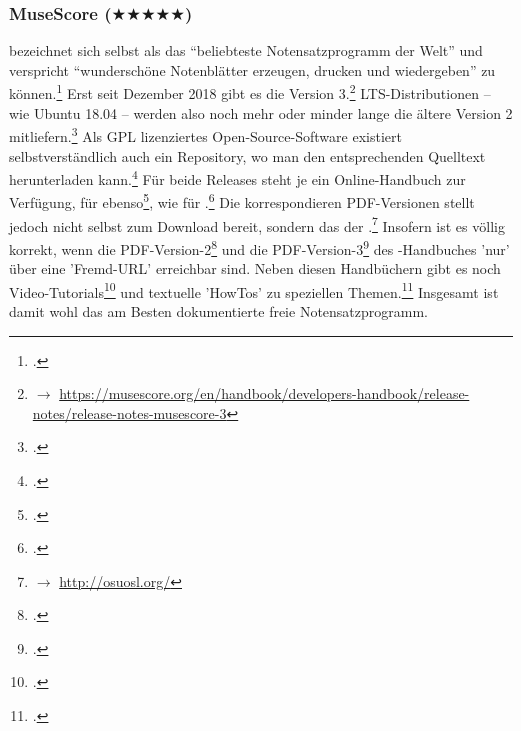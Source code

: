 %
%
%



\subsubsection{MuseScore ($\bigstar\bigstar\bigstar\bigstar\bigstar$)}

\label{MuseScore} bezeichnet sich selbst als das
\enquote{beliebteste Notensatzprogramm der Welt} und verspricht
\enquote{wunderschöne Notenblätter erzeugen, drucken und wiedergeben} zu
können.\footcite[vgl.][\nopage wp]{MuseScore2019a} Erst seit Dezember 2018 gibt
es die Version 3.\footnote{$\rightarrow$
\href{https://musescore.org/en/handbook/developers-handbook/release-notes/release-notes-musescore-3}
{https://musescore.org/en/handbook/developers-handbook/release-notes/release-notes-musescore-3}}
LTS-Distributionen -- wie Ubuntu 18.04 -- werden also noch mehr oder minder
lange die ältere Version 2 mitliefern.\footcite[vgl.][\nopage
wp]{UbuntuMuseScore2018a} Als GPL lizenziertes Open-Source-Software existiert
selbstverständlich auch ein Repository, wo man den entsprechenden Quelltext
herunterladen kann.\footcite[vgl.][\nopage wp]{GithubMuseScore2019a} Für beide
Releases steht je ein Online-Handbuch zur Verfügung, für 
ebenso\footcite[vgl.][\nopage wp]{MuseScore2019c}, wie für
.\footcite[vgl.][\nopage wp]{MuseScore2019d} Die korrespondieren
PDF-Versionen stellt jedoch nicht
 selbst zum Download bereit, sondern das 
der .\footnote{ $\rightarrow$
\href{http://osuosl.org/}{http://osuosl.org/}} Insofern ist es völlig korrekt,
wenn die PDF-Version-2\footcite[vgl.][\nopage wp]{MuseScore2019h} und die
PDF-Version-3\footcite[vgl.][\nopage wp]{MuseScore2019g} des
-Handbuches 'nur' über eine 'Fremd-URL' erreichbar sind. Neben
diesen Handbüchern gibt es noch Video-Tutorials\footcite[vgl.][\nopage
wp]{MuseScore2019e} und textuelle 'HowTos' zu speziellen
Themen.\footcite[vgl.][\nopage wp]{MuseScore2019f} Insgesamt ist 
damit wohl das am Besten dokumentierte freie Notensatzprogramm.

